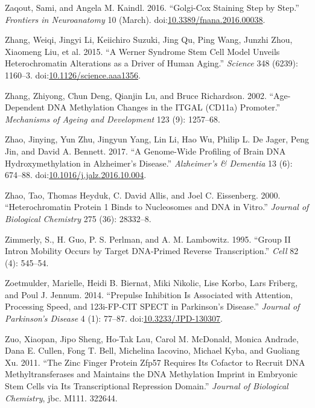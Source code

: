 \documentclass[onehalf,12pt]{beavtex}
\begin{document}
  \hypertarget{ref-ZaqoutGolgiCoxStainingStep2016}{}
  Zaqout, Sami, and Angela M. Kaindl. 2016. ``Golgi-Cox Staining Step by
  Step.'' \emph{Frontiers in Neuroanatomy} 10 (March).
  doi:\href{https://doi.org/10.3389/fnana.2016.00038}{10.3389/fnana.2016.00038}.
  
  \hypertarget{ref-ZhangWernersyndromestem2015}{}
  Zhang, Weiqi, Jingyi Li, Keiichiro Suzuki, Jing Qu, Ping Wang, Junzhi
  Zhou, Xiaomeng Liu, et al. 2015. ``A Werner Syndrome Stem Cell Model
  Unveils Heterochromatin Alterations as a Driver of Human Aging.''
  \emph{Science} 348 (6239): 1160--3.
  doi:\href{https://doi.org/10.1126/science.aaa1356}{10.1126/science.aaa1356}.
  
  \hypertarget{ref-ZhangAgedependentDNAmethylation2002}{}
  Zhang, Zhiyong, Chun Deng, Qianjin Lu, and Bruce Richardson. 2002.
  ``Age-Dependent DNA Methylation Changes in the ITGAL (CD11a) Promoter.''
  \emph{Mechanisms of Ageing and Development} 123 (9): 1257--68.
  
  \hypertarget{ref-Zhaogenomewideprofilingbrain2017}{}
  Zhao, Jinying, Yun Zhu, Jingyun Yang, Lin Li, Hao Wu, Philip L. De
  Jager, Peng Jin, and David A. Bennett. 2017. ``A Genome-Wide Profiling
  of Brain DNA Hydroxymethylation in Alzheimer's Disease.''
  \emph{Alzheimer's \& Dementia} 13 (6): 674--88.
  doi:\href{https://doi.org/10.1016/j.jalz.2016.10.004}{10.1016/j.jalz.2016.10.004}.
  
  \hypertarget{ref-ZhaoHeterochromatinproteinbinds2000}{}
  Zhao, Tao, Thomas Heyduk, C. David Allis, and Joel C. Eissenberg. 2000.
  ``Heterochromatin Protein 1 Binds to Nucleosomes and DNA in Vitro.''
  \emph{Journal of Biological Chemistry} 275 (36): 28332--8.
  
  \hypertarget{ref-ZimmerlyGroupIIintron1995}{}
  Zimmerly, S., H. Guo, P. S. Perlman, and A. M. Lambowitz. 1995. ``Group
  II Intron Mobility Occurs by Target DNA-Primed Reverse Transcription.''
  \emph{Cell} 82 (4): 545--54.
  
  \hypertarget{ref-ZoetmulderPrepulseInhibitionAssociated2014}{}
  Zoetmulder, Marielle, Heidi B. Biernat, Miki Nikolic, Lise Korbo, Lars
  Friberg, and Poul J. Jennum. 2014. ``Prepulse Inhibition Is Associated
  with Attention, Processing Speed, and 123i-FP-CIT SPECT in Parkinson's
  Disease.'' \emph{Journal of Parkinson's Disease} 4 (1): 77--87.
  doi:\href{https://doi.org/10.3233/JPD-130307}{10.3233/JPD-130307}.
  
  \hypertarget{ref-Zuozincfingerprotein2011}{}
  Zuo, Xiaopan, Jipo Sheng, Ho-Tak Lau, Carol M. McDonald, Monica Andrade,
  Dana E. Cullen, Fong T. Bell, Michelina Iacovino, Michael Kyba, and
  Guoliang Xu. 2011. ``The Zinc Finger Protein Zfp57 Requires Its Cofactor
  to Recruit DNA Methyltransferases and Maintains the DNA Methylation
  Imprint in Embryonic Stem Cells via Its Transcriptional Repression
  Domain.'' \emph{Journal of Biological Chemistry}, jbc. M111. 322644.
\end{document}

